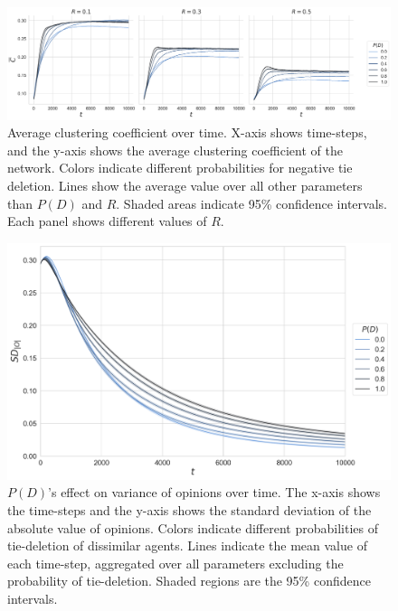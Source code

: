 \documentclass[11pt]{article}
\begin{document}
\begin{figure}[H]
    \centering
    \includegraphics[width=.9\linewidth]{../plots/overall/Average_Clustering_Coefficient_Ties_Deleted.png}
  \caption{Average clustering coefficient over time. X-axis shows time-steps, and the y-axis shows the average clustering coefficient of the network. Colors indicate different probabilities for negative tie deletion. Lines show the average value over all other parameters than $P(D)$ and $R$. Shaded areas indicate 95\% confidence intervals. Each panel shows different values of $R$.}
  \label{appendix:clustering}
\end{figure}

\begin{figure}[H]
    \centering
    \includegraphics[width=.9\linewidth]{../plots/overall/Standard_Deviation_Absolute_Opinion_Tie_Deletion.png}
  \caption{$P(D)$'s effect on variance of opinions over time. The x-axis shows the time-steps and the y-axis shows the standard deviation of the absolute value of opinions. Colors indicate different probabilities of tie-deletion of dissimilar agents. Lines indicate the mean value of each time-step, aggregated over all parameters excluding the probability of tie-deletion. Shaded regions are the 95\% confidence intervals. }
  \label{appendix:pd_sd}
\end{figure}
\end{document}
